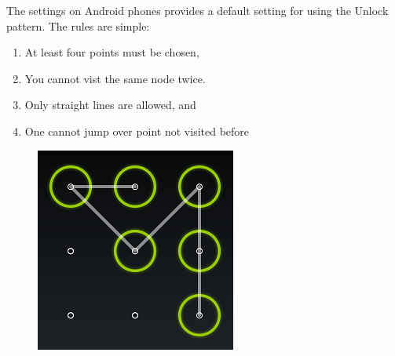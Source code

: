       The settings on Android phones provides a default setting for using the Unlock pattern. 
      The rules are simple: 
          \begin{enumerate}
              \item At least four points must be chosen,
              \item You cannot vist the same node twice.
              \item Only straight lines are allowed, and
              \item One cannot jump over point not visited before
          \end{enumerate}

      \begin{figure}[H]
          \centering
          \includegraphics[scale=0.8]{pics/patternLock.png}
      \end{figure}






